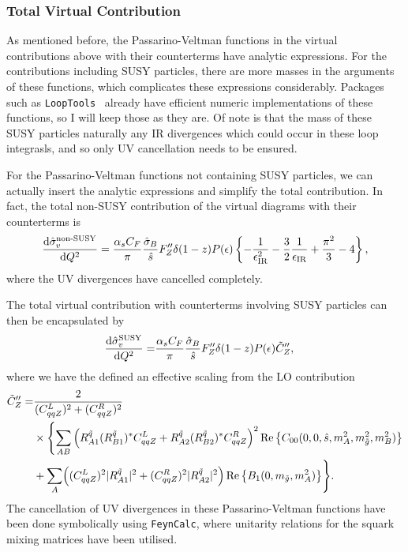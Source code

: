 \documentclass[../main.tex]{subfiles}
\begin{document}
\subsubsection*{Total Virtual Contribution}
As mentioned before, the Passarino-Veltman functions in the virtual contributions above with their counterterms have analytic expressions.
For the contributions including SUSY particles, there are more masses in the arguments of these functions, which complicates these expressions considerably.
Packages such as \verb|LoopTools|~\cite{LoopTools} already have efficient numeric implementations of these functions, so I will keep those as they are.
Of note is that the mass of these SUSY particles naturally any IR divergences which could occur in these loop integrasls, and so only UV cancellation needs to be ensured.

For the Passarino-Veltman functions not containing SUSY particles, we can actually insert the analytic expressions and simplify the total contribution.
In fact, the total non-SUSY contribution of the virtual diagrams with their counterterms is
\begin{equation}
  \label{pc:eq:nonSUSY_sigma_v}
  \d[Q^2]{\hat\sigma_v^{\text{non-SUSY}}} = \frac{\alpha_s C_F}{\pi} \frac{\hat\sigma_B}{\hat{s}} F_Z^{\prime\prime} \delta(1-z) P(\epsilon) \cclosed{-\frac{1}{\epsilon_\text{IR}^2} -\frac{3}{2}\frac{1}{\epsilon_\text{IR}} + \frac{\pi^2}{3} - 4},
\end{equation}
where the UV divergences have cancelled completely.

The total virtual contribution with counterterms involving SUSY particles can then be encapsulated by
\begin{align}
  \d[Q^2]{\hat\sigma_v^\text{SUSY}} = & \frac{\alpha_s C_F}{\pi} \frac{\hat\sigma_B}{\hat{s}} F_Z^{\prime\prime} \delta(1-z) P(\epsilon) \tilde{C}_Z^{\prime\prime},
\end{align}
where we have the defined an effective scaling from the LO contribution
\begin{align}
  \label{pc:eq:SUSY_sigma_v}
  \tilde{C}_Z^{\prime\prime} = & \frac{2}{(C_{qqZ}^L)^2 + (C_{qqZ}^R)^2}                                                                                                                   \\
  \nonumber
                               & \times \Biggl\{
  \sum_{AB} \pclosed{R^{\tilde{q}}_{A1}(R^{\tilde{q}}_{B1})^\ast C_{qqZ}^L + R^{\tilde{q}}_{A2}(R^{\tilde{q}}_{B2})^\ast C_{qqZ}^R}^2 \Re{C_{00}(0,0,\hat{s},m_A^2,m_{\tilde{g}}^2,m_B^2)} \\
                               & + \sum_{A} \Bigl( (C_{qqZ}^L)^2 |R_{A1}^{\tilde{q}}|^2 + (C_{qqZ}^R)^2 |R_{A2}^{\tilde{q}}|^2 \Bigr) \Re{B_1(0, m_{\tilde{g}}, m_A^2)}
  \Biggr\}.
\end{align}
The cancellation of UV divergences in these Passarino-Veltman functions have been done symbolically using \verb|FeynCalc|, where unitarity relations for the squark mixing matrices have been utilised.
\end{document}
